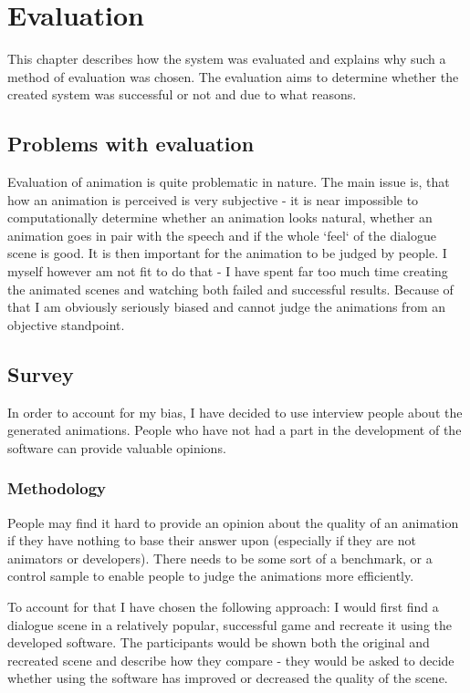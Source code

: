 \chapter{Evaluation \label{chap:eval}}
This chapter describes how the system was evaluated and explains why such a method of evaluation was chosen. The evaluation aims to determine whether the created system was successful or not and due to what reasons. 

\section{Problems with evaluation}
Evaluation of animation is quite problematic in nature. The main issue is, that how an animation is perceived is very subjective - it is near impossible to computationally determine whether an animation looks natural, whether an animation goes in pair with the speech and if the whole `feel` of the dialogue scene is good. It is then important for the animation to be judged by people. I myself however am not fit to do that - I have spent far too much time creating the animated scenes and watching both failed and successful results. Because of that I am obviously seriously biased and cannot judge the animations from an objective standpoint.


\section{Survey}
In order to account for my bias, I have decided to use interview people about the generated animations. People who have not had a part in the development of the software can provide valuable opinions.


\subsection{Methodology}
People may find it hard to provide an opinion about the quality of an animation if they have nothing to base their answer upon (especially if they are not animators or developers). There needs to be some sort of a benchmark, or a control sample to enable people to judge the animations more efficiently.

To account for that I have chosen the following approach: I would first find a dialogue scene in a relatively popular, successful game and recreate it using the developed software. The participants would be shown both the original and recreated scene and describe how they compare - they would be asked to decide whether using the software has improved or decreased the quality of the scene. 


